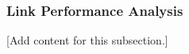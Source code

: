 
\subsubsection{Link Performance Analysis}
\label{subsubsec:design_2_3_5_link_performance_analysis}

[Add content for this subsection.]
